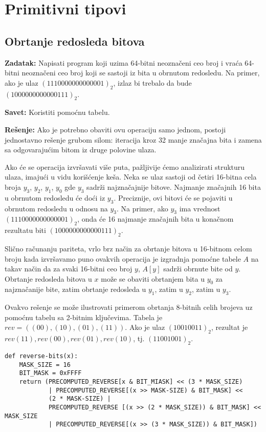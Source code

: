 \documentclass[11pt,a4paper]{article}
\begin{document}
\section{Primitivni tipovi}

\subsection{Obrtanje redosleda bitova}

\textbf{Zadatak:} Napisati program koji uzima 64-bitni neoznačeni ceo broj i
vraća 64-bitni neoznačeni ceo broj koji se sastoji iz bita u obrnutom redosledu.
Na primer, ako je ulaz $(1110000000000001)_2$, izlaz bi trebalo da bude
$(1000000000000111)_2$.

\textbf{Savet:} Koristiti pomoćnu tabelu.

\textbf{Rešenje:} Ako je potrebno obaviti ovu operaciju samo jednom, postoji
jednostavno rešenje grubom silom: iteracija kroz 32 manje značajna bita i zamena
sa odgovarajućim bitom iz druge polovine ulaza.

Ako će se operacija izvršavati više puta, pažljivije ćemo analizirati strukturu
ulaza, imajući u vidu korišćenje keša. Neka se ulaz sastoji od četiri 16-bitna
cela broja $y_3$, $y_2$, $y_1$, $y_0$ gde $y_3$ sadrži najznačajnije bitove.
Najmanje značajnih 16 bita u obrnutom redosledu će doći iz $y_3$. Preciznije,
ovi bitovi će se pojaviti u obrnutom redosledu u odnosu na $y_3$. Na primer, ako
$y_3$ ima vrednost $(1110000000000001)_2$, onda će 16 najmanje značajnih bita u
konačnom rezultatu biti $(1000000000000111)_2$.

Slično računanju pariteta, vrlo brz način za obrtanje bitova u 16-bitnom celom
broju kada izvršavamo puno ovakvih operacija je izgradnja pomoćne tabele $A$ na
takav način da za svaki 16-bitni ceo broj $y$, $A[y]$ sadrži obrnute bite od
$y$. Obrtanje redosleda bitova u $x$ može se obaviti obrtanjem bita u $y_0$ za
najznačanije bite, zatim obrtanje redosleda u $y_1$, zatim u $y_2$, zatim u
$y_3$.

Ovakvo rešenje se može ilustrovati primerom obrtanja 8-bitnih celih brojeva uz
pomoćnu tabelu sa 2-bitnim ključevima. Tabela je $rev = ((00),(10),(01),(11))$.
Ako je ulaz $(10010011)_2$, rezultat je $rev(11),rev(00),rev(01),rev(10)$, tj.
$(11001001)_2$.

\begin{verbatim}
def reverse-bits(x):
    MASK_SIZE = 16
    BIT_MASK = 0xFFFF
    return (PRECOMPUTED_REVERSE[x & BIT_MIASK] << (3 * MASK_SIZE)
            | PRECOMPUTED_REVERSE[(x >> MASK-SIZE) & BIT_MASK] <<
            (2 * MASK-SIZE) |
            PRECOMPUTED_REVERSE [(x >> (2 * MASK_SIZE)) & BIT_MASK] << MASK_SIZE
            | PRECOMPUTED_REVERSE[(x >> (3 * MASK_SIZE)) & BIT_MASK])
\end{verbatim}
\end{document}
